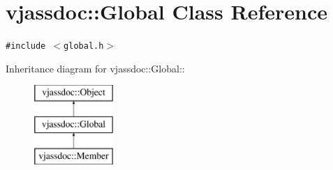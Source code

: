 \hypertarget{classvjassdoc_1_1Global}{
\section{vjassdoc::Global Class Reference}
\label{classvjassdoc_1_1Global}
}
{\tt \#include $<$global.h$>$}

Inheritance diagram for vjassdoc::Global::\begin{figure}[H]
\begin{center}
\leavevmode
\includegraphics[height=3cm]{classvjassdoc_1_1Global}
\end{center}
\end{figure}
